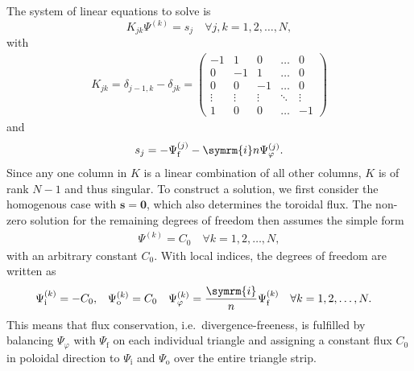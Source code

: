 \documentclass[a4paper, 10pt, english]{article}
\let\temp\varrho
\let\varrho\rho
\let\rho\temp
\let\temp\vartheta
\let\vartheta\theta
\let\theta\temp
\let\temp\varphi
\let\varphi\phi
\let\phi\temp
\let\vec\symbf
\newcommand*\im{\ensuremath{\symrm{i}}}  %
\newcommand*\fs{\ensuremath{\textrm{f}}}  %
\newcommand*\inw{\ensuremath{\textrm{i}}}  %
\newcommand*\out{\ensuremath{\textrm{o}}}  %
\begin{document}
The system of linear equations to solve is
\begin{equation}
  K_{jk} \Psi^{(k)} = s_{j} \quad \forall j, k = 1, 2, \dotsc, N,
\end{equation}
with
\begin{gather}
  K_{jk} = \delta_{j-1, k} - \delta_{jk} = \begin{pmatrix}
    -1   &    1   &    0   & \hdots &    0   \\
     0   &   -1   &    1   & \hdots &    0   \\
     0   &    0   &   -1   & \hdots &    0   \\
  \vdots & \vdots & \vdots & \ddots & \vdots \\
     1   &    0   &    0   & \hdots &   -1
  \end{pmatrix}
\end{gather}
and
\begin{gather}
  s_{j} = -\Psi_{\fs}^{(j)} - \im n \Psi_{\phi}^{(j)}.
\end{gather}
Since any one column in $K$ is a linear combination of all other columns, $K$ is of rank $N - 1$ and thus singular. To construct a solution, we first consider the homogenous case with $\vec{s} = \vec{0}$, which also determines the toroidal flux. The non-zero solution for the remaining degrees of freedom then assumes the simple form
\begin{gather}
  \Psi^{(k)} = C_{0} \quad \forall k = 1, 2, \dotsc, N,
\end{gather}
with an arbitrary constant $C_{0}$. With local indices, the degrees of freedom are written as 
\begin{align}
  \Psi_{\inw}^{(k)} &= -C_{0}, & \Psi_{\out}^{(k)} &= C_{0} & \Psi_{\phi}^{(k)} &= \frac{\im}{n} \Psi_{\fs}^{(k)} \quad \forall k = 1, 2, \dotsc, N. \label{eq:Psi_hom}
\end{align}
This means that flux conservation, i.e.\ divergence-freeness, is fulfilled by balancing $\Psi_{\phi}$ with $\Psi_{\fs}$ on each individual triangle and assigning a constant flux $C_{0}$ in poloidal direction to $\Psi_{\inw}$ and $\Psi_{\out}$ over the entire triangle strip.
\end{document}
